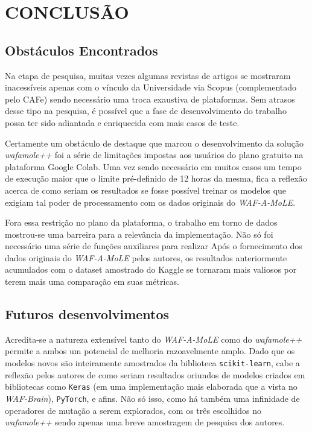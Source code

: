\chapter{CONCLUSÃO}
\label{chp:capitulo6}

\section{Obstáculos Encontrados}

Na etapa de pesquisa, muitas vezes algumas revistas de artigos se mostraram inacessíveis apenas com o vínculo da Universidade via Scopus (complementado pelo CAFe) sendo necessário uma troca exaustiva de plataformas. Sem atrasos desse tipo na pesquisa, é possível que a fase de desenvolvimento do trabalho possa ter sido adiantada e enriquecida com mais casos de teste.

Certamente um obstáculo de destaque que marcou o desenvolvimento da solução \textit{wafamole++} foi a série de limitações impostas aos usuários do plano gratuito na plataforma Google Colab. Uma vez sendo necessário em muitos casos um tempo de execução maior que o limite pré-definido de 12 horas da mesma, fica a reflexão acerca de como seriam os resultados se fosse possível treinar os modelos que exigiam tal poder de processamento com os dados originais do \textit{WAF-A-MoLE}.

Fora essa restrição no plano da plataforma, o trabalho em torno de dados mostrou-se uma barreira para a relevância da implementação. Não só foi necessário uma série de funções auxiliares para realizar Após o fornecimento dos dados originais do \textit{WAF-A-MoLE} pelos autores, os resultados anteriormente acumulados com o dataset amostrado do Kaggle se tornaram mais valiosos por terem mais uma comparação em suas métricas.

\section{Futuros desenvolvimentos}
Acredita-se a natureza extensível tanto do \textit{WAF-A-MoLE} como do \textit{wafamole++} permite a ambos um potencial de melhoria razoavelmente amplo. Dado que os modelos novos são inteiramente amostrados da biblioteca \verb+scikit-learn+, cabe a reflexão pelos autores de como seriam resultados oriundos de modelos criados em bibliotecas como \verb+Keras+ (em uma implementação mais elaborada que a vista no \textit{WAF-Brain}), \verb+PyTorch+, e afins. Não só isso, como há também uma infinidade de operadores de mutação a serem explorados, com os três escolhidos no \textit{wafamole++} sendo apenas uma breve amostragem de pesquisa dos autores.


